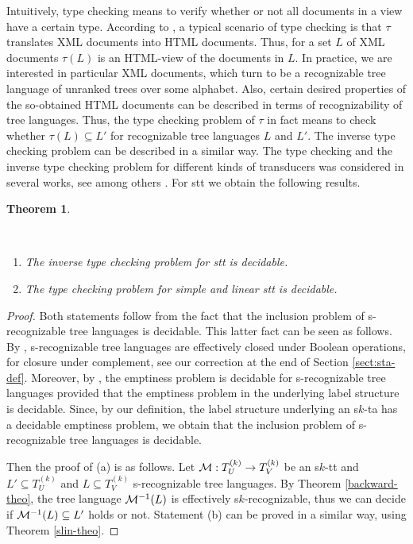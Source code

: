 \documentclass[10pt]{scrartcl}
\newtheorem{theo}[df]{Theorem}
\newcommand{\M}{{\cal M}}
\def\ui#1{^{(#1)}}
\begin{document}
Intuitively, type checking means to verify whether or not all documents in a view have a certain type. According to \cite{engman03}, a typical scenario of type checking is that  $\tau$ translates XML documents into HTML documents. Thus, for a set $L$ of XML documents $\tau(L)$ is an HTML-view of the documents in $L$. In practice, we are interested in particular XML documents, which turn to be a recognizable tree language of unranked trees over some alphabet. 
Also, certain desired properties of the so-obtained HTML documents can be described in terms of recognizability of tree languages. Thus, the type checking problem of $\tau$ in fact means to check whether $\tau(L)\subseteq L'$ for recognizable   tree languages $L$ and $L'$. The inverse type checking problem can be described in a similar way. The type checking and the inverse type checking problem for different kinds of transducers was considered in several works, see among others \cite{milsucvia03,alomilnevsucvia03,engman03,manberpersei05}.
For stt we obtain the following results.

\begin{theo}\label{thm:type-checking} 

\

\begin{enumerate}
\item[(a)] The inverse type checking problem for stt is decidable.
\item[(b)] The type checking problem for simple and linear stt is decidable. 
\end{enumerate}
\end{theo}
\begin{proof}Both statements follow from the fact that the inclusion problem of s-recognizable tree languages is decidable. This latter fact can be seen as follows. By \cite[Thm. 3]{veabjo11a}, s-recognizable tree languages are effectively closed under Boolean operations, for closure under complement, see our correction at the end of Section \ref{sect:sta-def}. Moreover, by \cite[Thm. 4]{veabjo11a}, the emptiness problem is decidable for s-recognizable tree languages provided that the emptiness problem in the underlying label structure is decidable. Since, by our definition, the label structure underlying an s$k$-ta has a decidable emptiness problem, we obtain that the inclusion problem of s-recognizable tree languages is decidable.

Then the proof of (a) is as follows. Let $\M:T_U\ui k\to T_V\ui k$ be an s$k$-tt and $L'\subseteq T_U\ui k$ and $L\subseteq T_V\ui k$ s-recognizable tree languages.  By Theorem \ref{backward-theo},  the tree language  $\M^{-1}(L)$ is effectively s$k$-recognizable, thus we can decide if
$\M^{-1}(L)\subseteq L'$ holds or not. Statement (b) can be proved in a similar way, using Theorem \ref{slin-theo}.
\end{proof} 
\end{document}
